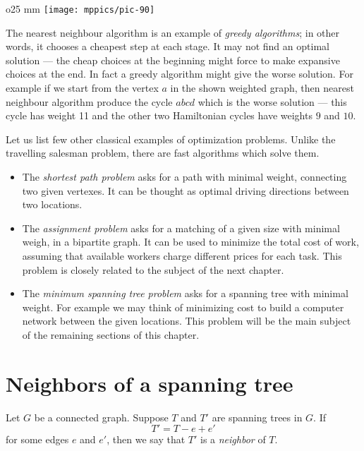 \begin{wrapfigure}{o}{25 mm}
\vskip-0mm
\centering
\texttt{[image: mppics/pic-90]}
\end{wrapfigure}

The nearest neighbour algorithm is an example of \emph{greedy algorithms}; in other words, it chooses a cheapest step at each stage.
It may not find an optimal solution --- the cheap choices at the beginning might force to make expansive choices at the end. 
In fact a greedy algorithm might give the worse solution.
For example if we start from the vertex $a$ in the shown weighted graph, then nearest neighbour algorithm produce the cycle $abcd$ which is the worse solution --- this cycle has weight 11 and the other two  Hamiltonian cycles have weights $9$ and $10$.

Let us list few other classical examples of optimization problems.
Unlike the travelling salesman problem, there are fast algorithms which solve them.
\begin{itemize}
\item The \emph{shortest path problem} asks for a path with minimal weight, connecting two given vertexes.
It can be thought as optimal driving directions between two locations.
\item The \emph{assignment problem}  asks for a matching of a given size with minimal weigh, in a bipartite graph.
It can be used to minimize the total cost of work, assuming that available workers charge different prices for each task.
This problem is closely related to the subject of the next chapter.
\item The \emph{minimum spanning tree problem} asks for a spanning tree with minimal weight.
For example we may think of minimizing cost to build a computer network between the given locations.
This problem will be the main subject of the remaining sections of this chapter.
\end{itemize}


\section*{Neighbors of a spanning tree}

Let $G$ be a connected graph.
Suppose $T$ and $T'$ are spanning trees in $G$.
If 
\[T'=T-e+e'\]
for some edges $e$ and $e'$,
then we say that $T'$ is a \emph{neighbor} of $T$.

